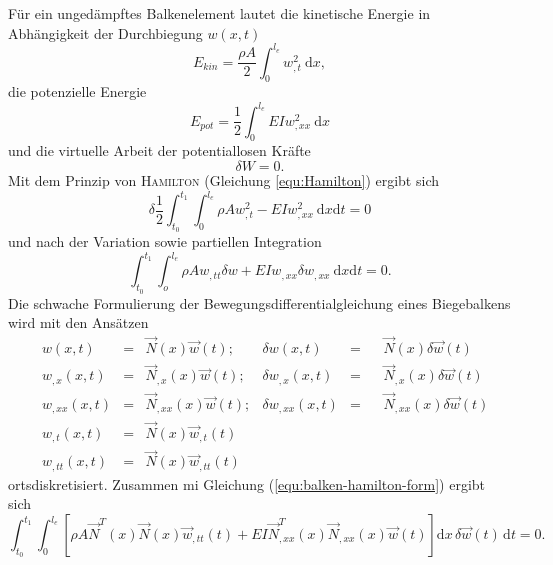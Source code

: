 \documentclass[a4paper,10pt,twoside]{article}
\numberwithin{equation}{section} %
\numberwithin{figure}{section}   %
\numberwithin{table}{section}    %
\begin{document}
	Für ein ungedämpftes Balkenelement lautet die kinetische Energie in Abhängigkeit der Durchbiegung $w(x,t)$
	\begin{equation}\label{equ:balken-kin-energie}
	E_{kin} = \frac{\rho A}{2} \int_{0}^{l_{e}} w_{,t}^{2} \ \mathrm{d}x,
	\end{equation}
	die potenzielle Energie
	\begin{equation}\label{equ:balken-pot-energie}
	E_{pot} = \frac{1}{2} \int_{0}^{l_{e}} E I w_{,xx}^{2} \ \mathrm{d}x
	\end{equation}
	und die virtuelle Arbeit der potentiallosen Kräfte
	\begin{equation}\label{equ:balken-virt-arbeit}
	\delta W = 0.
	\end{equation}
	Mit dem Prinzip von \textsc{Hamilton} (Gleichung \ref{equ:Hamilton}) ergibt sich
	\begin{equation}\label{equ:balken-hamilton}
	\delta \frac{1}{2} \int_{t_{0}}^{t_{1}} \int_{0}^{l_{e}} \rho A w_{,t}^{2} - EI w_{,xx}^{2} \ \mathrm{d}x \mathrm{d}t = 0
	\end{equation}
	und nach der Variation sowie partiellen Integration
	\begin{equation}\label{equ:balken-hamilton-form}
	\int_{t_{0}}^{t_{1}} \int_{o}^{l_{e}} \rho A w_{,tt} \delta w + EI  w_{,xx} \delta w_{,xx} \ \mathrm{d}x \mathrm{d}t =0.
	\end{equation}
	Die schwache Formulierung der Bewegungsdifferentialgleichung eines Biegebalkens wird mit den Ansätzen
	\begin{equation}\label{equ:balken-hamilton-ansatz}
	\begin{aligned}
	&w(x,t) &=& \vec{N}(x) \vec{w}(t);	&\delta w(x,t) &=& &\vec{N}(x) \delta\vec{w}(t)\\
	&w_{,x}(x,t) &=& \vec{N}_{,x}(x) \vec{w}(t); &\delta w_{,x}(x,t) &=& &\vec{N}_{,x}(x) \delta\vec{w}(t)\\
	&w_{,xx}(x,t) &=& \vec{N}_{,xx}(x) \vec{w}(t); &\delta w_{,xx}(x,t) &=& &\vec{N}_{,xx}(x) \delta\vec{w}(t)\\
	&w_{,t}(x,t) &=& \vec{N}(x) \vec{w}_{,t}(t)\\
	&w_{,tt}(x,t) &=& \vec{N}(x) \vec{w}_{,tt}(t)
	\end{aligned}
	\end{equation}
	ortsdiskretisiert. Zusammen mi Gleichung (\ref{equ:balken-hamilton-form}) ergibt sich
	\begin{equation}\label{equ:balken-hamilton-end}
	\int_{t_{0}}^{t_{1}} \int_{0}^{l_{e}} \left[ \rho A \vec{N}^{T}(x) \vec{N}(x) \vec{w}_{,tt}(t) + EI \vec{N}_{,xx}^{T}(x) \vec{N}_{,xx}(x) \vec{w}(t) \right] \mathrm{d}x \,\delta\vec{w}(t) \, \mathrm{d}t = 0.
	\end{equation}
\end{document}
